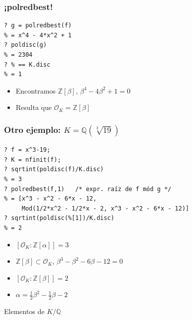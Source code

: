 \documentclass{beamer}
\newcommand{\ZZ}{\mathbb{Z}}
\newcommand{\QQ}{\mathbb{Q}}
\renewcommand{\O}{\mathcal{O}}
\begin{document}

\begin{frame}[fragile]
  \frametitle{¡polredbest!}

  \begin{shaded}\small
\begin{verbatim}
? g = polredbest(f)
% = x^4 - 4*x^2 + 1
? poldisc(g)
% = 2304
? % == K.disc 
% = 1
\end{verbatim}
  \end{shaded}

  \begin{itemize}
    \item Encontramos $\ZZ [\beta]$, $\beta^4 - 4\beta^2 + 1 = 0$
    \item Resulta que $\O_K = \ZZ [\beta]$
  \end{itemize}
\end{frame}


\begin{frame}[fragile]
  \frametitle{Otro ejemplo: $K = \QQ (\sqrt[3]{19})$}
  \begin{shaded}\small
\begin{verbatim}
? f = x^3-19;
? K = nfinit(f);
? sqrtint(poldisc(f)/K.disc)
% = 3
? polredbest(f,1)   /* expr. raíz de f mód g */
% = [x^3 - x^2 - 6*x - 12,
     Mod(1/2*x^2 - 1/2*x - 2, x^3 - x^2 - 6*x - 12)]
? sqrtint(poldisc(%[1])/K.disc)
% = 2
\end{verbatim}
  \end{shaded}

  \begin{itemize}
  \item $[\O_K : \ZZ [\alpha]] = 3$
  \item $\ZZ [\beta] \subset \O_K$, $\beta^3 - \beta^2 - 6\beta - 12 = 0$
  \item $[\O_K : \ZZ [\beta]] = 2$
  \item $\alpha = \frac{1}{2}\beta^2 - \frac{1}{2}\beta - 2$
  \end{itemize}
\end{frame}


\begin{frame}[plain]
  \headingfont

  \begin{center}
    {\huge Elementos de $K/\QQ$}
  \end{center}
\end{frame}
\end{document}

